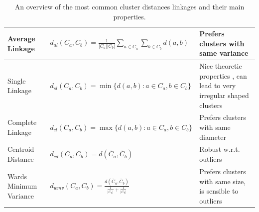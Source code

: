 \begin{table}
\begin{scriptsize}
\begin{tabular}{ |l|l|p{5cm}|}
    \hline
    Average Linkage \citep{sokal_1958_science_bulletin}           
        & $d_{al}(C_a,C_b) = \frac{1}{|C_a||C_b|} \sum _{a \in C_a} \sum_{b \in C_b} d(a,b) $ 
        & \scriptsize Prefers clusters with same variance \cite{sokal_1958_science_bulletin} \\ \hline

    Single Linkage \citep{florek_1951}            
        & $d_{sl}(C_a,C_b) =  \min\{d(a,b) : a \in C_a, b \in C_b\}$ 
        & Nice theoretic properties \citep{hartigan_1981_jjamstat,milligan_1980_psycho}, can lead
          to very irregular shaped clusters \\ \hline
    Complete Linkage \citep{sorensen_1948}         
        & $d_{cl}(C_a,C_b) =  \max\{d(a,b) : a \in C_a, b \in C_b\}$ 
        & Prefers clusters with same diameter \citep{milligan_1980_psycho} \\ \hline
    Centroid Distance         
        & $d_{cd}(C_a,C_b) =  d(\bar{C}_a,\bar{C}_b) $ 
        & Robust w.r.t. outliers \citep{milligan_1980_psycho} \\ \hline
    Wards Minimum Variance \citep{ward_63_jasa}
        & $d_{wmv}(C_a,C_b) = \frac{ d(\bar{C}_a,\bar{C}_b)}{ \frac{1}{|C_a|} + \frac{1}{|C_b|} } $ 
        & Prefers clusters with same size, is sensible to outliers \citep{milligan_1980_psycho} \\ \hline
\end{tabular}

\end{scriptsize}

\caption{
    An overview of the most common cluster distances linkages and their main properties.
}\label{tab:hc_linkage_types}
\end{table}






